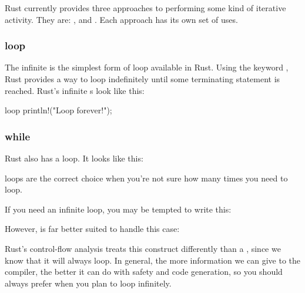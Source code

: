Rust currently provides three approaches to performing some kind of iterative activity. They are: ,  and 
. Each approach has its own set of uses.

\subsubsection*{loop}

The infinite  is the simplest form of loop available in Rust. Using the keyword , Rust provides a way to 
loop indefinitely until some terminating statement is reached. Rust's infinite s look like this:

\begin{rustc}
loop {
    println!("Loop forever!");
}
\end{rustc}

\subsubsection*{while}

Rust also has a  loop. It looks like this:


 loops are the correct choice when you're not sure how many times you need to loop.

\blank

If you need an infinite loop, you may be tempted to write this:

\begin{rustc}
while true {
\end{rustc}

However,  is far better suited to handle this case:

\begin{rustc}
loop {
\end{rustc}

Rust's control-flow analysis treats this construct differently than a , since we know that it will always loop. 
In general, the more information we can give to the compiler, the better it can do with safety and code generation, so you should 
always prefer  when you plan to loop infinitely.


